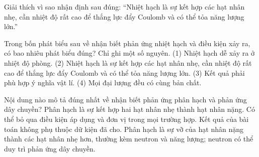 \begin{bt}
Giải thích vì sao nhận định sau đúng: “Nhiệt hạch là sự kết hợp các hạt nhân nhẹ, cần nhiệt độ rất cao để thắng lực đẩy Coulomb và có thể tỏa năng lượng lớn.”
\end{bt}

\begin{ex}
Trong bốn phát biểu sau về nhận biết phản ứng nhiệt hạch và điều kiện xảy ra, có bao nhiêu phát biểu đúng? Chỉ ghi một số nguyên. (1) Nhiệt hạch dễ xảy ra ở nhiệt độ phòng. (2) Nhiệt hạch là sự kết hợp các hạt nhân nhẹ, cần nhiệt độ rất cao để thắng lực đẩy Coulomb và có thể tỏa năng lượng lớn. (3) Kết quả phải phù hợp ý nghĩa vật lí. (4) Mọi đại lượng đều có cùng bản chất.
\end{ex}

\begin{ex}
Nội dung nào mô tả đúng nhất về nhận biết phản ứng phân hạch và phản ứng dây chuyền?
\choice
{Phân hạch là sự kết hợp hai hạt nhân nhẹ thành hạt nhân nặng.}
{Có thể bỏ qua điều kiện áp dụng và đơn vị trong mọi trường hợp.}
{Kết quả của bài toán không phụ thuộc dữ kiện đã cho.}
{\True Phân hạch là sự vỡ của hạt nhân nặng thành các hạt nhân nhẹ hơn, thường kèm neutron và năng lượng; neutron có thể duy trì phản ứng dây chuyền.}
\end{ex}

